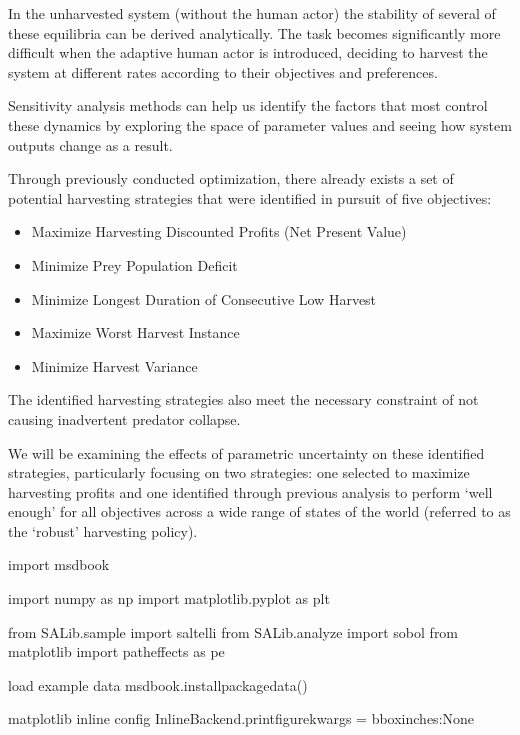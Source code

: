 \documentclass[letterpaper,10pt,english]{book}
\begin{document}
\sphinxAtStartPar
In the unharvested system (without the human actor) the stability of
several of these equilibria can be derived analytically. The task
becomes significantly more difficult when the adaptive human actor is
introduced, deciding to harvest the system at different rates according
to their objectives and preferences.

\sphinxAtStartPar
Sensitivity analysis methods can help us identify the factors that most
control these dynamics by exploring the space of parameter values and
seeing how system outputs change as a result.

\sphinxAtStartPar
Through previously conducted optimization, there already exists a set of
potential harvesting strategies that were identified in pursuit of five
objectives:
\begin{itemize}
\item {} 
\sphinxAtStartPar
Maximize Harvesting Discounted Profits (Net Present Value)

\item {} 
\sphinxAtStartPar
Minimize Prey Population Deficit

\item {} 
\sphinxAtStartPar
Minimize Longest Duration of Consecutive Low Harvest

\item {} 
\sphinxAtStartPar
Maximize Worst Harvest Instance

\item {} 
\sphinxAtStartPar
Minimize Harvest Variance

\end{itemize}

\sphinxAtStartPar
The identified harvesting strategies also meet the necessary constraint
of not causing inadvertent predator collapse.

\sphinxAtStartPar
We will be examining the effects of parametric uncertainty on these
identified strategies, particularly focusing on two strategies: one
selected to maximize harvesting profits and one identified through
previous analysis to perform ‘well enough’ for all objectives across a
wide range of states of the world (referred to as the ‘robust’
harvesting policy).

\begin{sphinxVerbatim}[commandchars=\\\{\}]
import msdbook

import numpy as np
import matplotlib.pyplot as plt

from SALib.sample import saltelli
from SALib.analyze import sobol
from matplotlib import patheffects as pe

\PYGZsh{} load example data
msdbook.install\PYGZus{}package\PYGZus{}data()

\PYGZpc{}matplotlib inline
\PYGZpc{}config InlineBackend.print\PYGZus{}figure\PYGZus{}kwargs = \PYGZob{}\PYGZsq{}bbox\PYGZus{}inches\PYGZsq{}:None\PYGZcb{}
\end{sphinxVerbatim}
\end{document}
